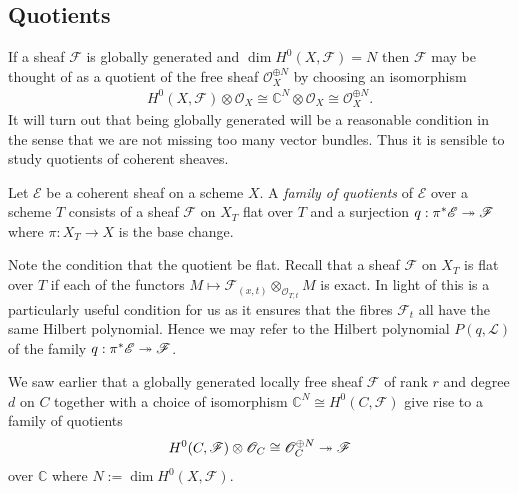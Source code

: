 \documentclass[12pt]{ociamthesis}  %
\begin{document}
\subsection{Quotients}

If a sheaf $\mathscr F$ is globally generated and
$\dim H^0(X,\mathscr F) = N$ then $\mathscr F$ may be thought
of as a quotient of the free sheaf $\mathscr O_X^{\oplus N}$
by choosing an isomorphism
\begin{align*}
  H^0(X,\mathscr F) \otimes \mathscr O_X \cong \mathbb{C}^N \otimes \mathscr O_X \cong \mathscr O_X^{\oplus N}.
\end{align*}
It will turn out that being globally generated will be a reasonable
condition in the sense that we are not missing too many vector
bundles. Thus it is sensible to study quotients of coherent sheaves.

\begin{definition}
  Let $\mathscr E$ be a coherent sheaf on a scheme $X$.
  A \emph{family of quotients} of $\mathscr E$ over a scheme $T$
  consists of a sheaf $\mathscr F$ on $X_T$ flat over $T$ and a
  surjection $q:\pi^*\mathscr E\twoheadrightarrow\mathscr F$ where
  $\pi : X_T \to X$ is the base change.
\end{definition}

Note the condition that the quotient be flat. Recall that a sheaf
$\mathscr F$ on $X_T$ is flat over $T$ if each of the functors
$M \mapsto \mathscr F_{(x,t)} \otimes_{\mathscr O_{T,t}} M$ is exact.
In light of \cite[III Theorem 9.9]{hartshorne1977} this is a
particularly useful condition for us as it ensures that the fibres
$\mathscr F_t$ all have the same Hilbert polynomial. Hence we may
refer to the Hilbert polynomial $P(q,\mathscr L)$ of the family
$q:\pi^*\mathscr E\twoheadrightarrow\mathscr F$.

\begin{example}
  We saw earlier that a globally generated locally free sheaf
  $\mathscr F$ of rank $r$ and degree $d$ on $C$ together with
  a choice of isomorphism $\mathbb{C}^N \cong H^0(C,\mathscr F)$
  give rise to a family of quotients
  \begin{align*}
    H^0(C,\mathscr F)\otimes\mathscr O_C \cong \mathscr O^{\oplus N}_C
    \twoheadrightarrow \mathscr F
  \end{align*}
  over $\mathbb{C}$ where $N := \dim H^0(X,\mathscr F)$.
\end{example}
\end{document}
